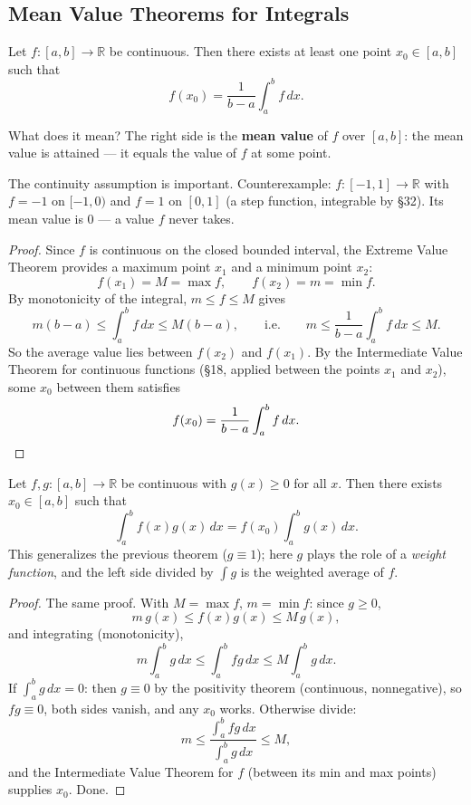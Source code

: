 \documentclass[11pt]{report}
\begin{document}
\subsection{Mean Value Theorems for Integrals}

\begin{thmbox}
Let $f: [a,b] \to \mathbb{R}$ be continuous. Then there exists at least one point $x_0 \in [a,b]$ such that
\[
f(x_0) = \frac{1}{b-a} \int_a^b f\,dx.
\]
\end{thmbox}

What does it mean? The right side is the \textbf{mean value} of $f$ over $[a,b]$: the mean value is attained --- it equals the value of $f$ at some point.

\begin{rembox}
The continuity assumption is important. Counterexample: $f: [-1,1] \to \mathbb{R}$ with $f = -1$ on $[-1, 0)$ and $f = 1$ on $[0,1]$ (a step function, integrable by \S 32). Its mean value is $0$ --- a value $f$ never takes.
\end{rembox}

\begin{proof}
Since $f$ is continuous on the closed bounded interval, the Extreme Value Theorem provides a maximum point $x_1$ and a minimum point $x_2$:
\[
f(x_1) = M = \max f, \qquad f(x_2) = m = \min f.
\]
By monotonicity of the integral, $m \leq f \leq M$ gives
\[
m(b-a) \leq \int_a^b f\,dx \leq M(b-a), \qquad \text{i.e.} \qquad m \leq \frac{1}{b-a}\int_a^b f\,dx \leq M.
\]
So the average value lies between $f(x_2)$ and $f(x_1)$. By the Intermediate Value Theorem for continuous functions (\S 18, applied between the points $x_1$ and $x_2$), some $x_0$ between them satisfies
\[
f(x_0) = \frac{1}{b-a}\int_a^b f\,dx. \qedhere
\]
\end{proof}

\begin{thmbox}
Let $f, g: [a,b] \to \mathbb{R}$ be continuous with $g(x) \geq 0$ for all $x$. Then there exists $x_0 \in [a,b]$ such that
\[
\int_a^b f(x)g(x)\,dx = f(x_0) \int_a^b g(x)\,dx.
\]
This generalizes the previous theorem ($g \equiv 1$); here $g$ plays the role of a \emph{weight function}, and the left side divided by $\int g$ is the weighted average of $f$.
\end{thmbox}

\begin{proof}
The same proof. With $M = \max f$, $m = \min f$: since $g \geq 0$,
\[
m\,g(x) \leq f(x)g(x) \leq M\,g(x),
\]
and integrating (monotonicity),
\[
m \int_a^b g\,dx \leq \int_a^b fg\,dx \leq M \int_a^b g\,dx.
\]
If $\int_a^b g\,dx = 0$: then $g \equiv 0$ by the positivity theorem (continuous, nonnegative), so $fg \equiv 0$, both sides vanish, and any $x_0$ works. Otherwise divide:
\[
m \leq \frac{\int_a^b fg\,dx}{\int_a^b g\,dx} \leq M,
\]
and the Intermediate Value Theorem for $f$ (between its min and max points) supplies $x_0$. Done.
\end{proof}
\end{document}

